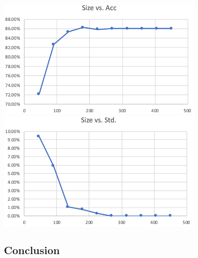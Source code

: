 \documentclass[12pt]{article}
\begin{document}
    \bigbreak
    \includegraphics[height=6cm]{perc_acc_face}
    \bigbreak
    \includegraphics[height=6cm]{perc_std_face}
\subsection{Conclusion}
\end{document}
